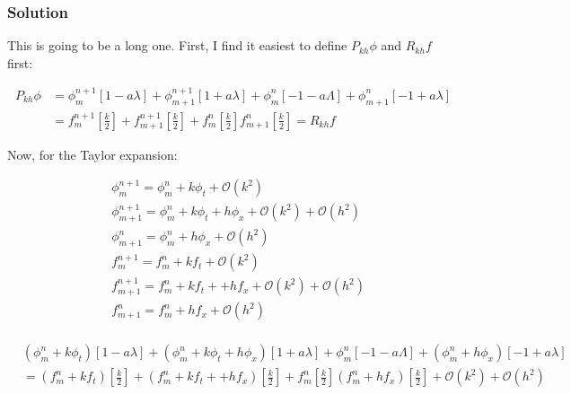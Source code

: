 \documentclass[12pt]{article}
\begin{document}
\subsubsection*{Solution}

This is going to be a long one. First, I find it easiest to define $P_{kh}\phi$ and $R_{kh}f$ first:

\begin{equation*}
    \begin{aligned}
    P_{kh}\phi & = \phi_m^{n+1}[1-a\lambda] + 
    \phi_{m+1}^{n+1}[1+a\lambda] + 
    \phi_{m}^{n}[-1-a\Lambda] + 
    \phi_{m+1}^{n}[-1+a\lambda] \\
     & = f_{m}^{n+1}\left[\frac{k}{2}\right] +f_{m+1}^{n+1}\left[\frac{k}{2}\right] +f_{m}^{n}\left[\frac{k}{2}\right] f_{m+1}^{n}\left[\frac{k}{2}\right] = R_{kh}f
    \end{aligned}
\end{equation*}

\noindent Now, for the Taylor expansion:

\begin{equation*}
\begin{aligned}
	&\phi_m^{n+1} = \phi_m^n + k\phi_t + \mathcal{O}(k^2)\\
	&\phi_{m+1}^{n+1} = \phi_m^n + k\phi_t + h\phi_x+ \mathcal{O}(k^2)+ \mathcal{O}(h^2)\\
	&\phi_{m+1}^n = \phi_m^n + h\phi_x + \mathcal{O}(h^2)\\
	&f_m^{n+1} = f_m^n + kf_t + \mathcal{O}(k^2)\\
	&f_{m+1}^{n+1} = f_m^n + kf_t + +hf_x +\mathcal{O}(k^2)+ \mathcal{O}(h^2)\\
	&f_{m+1}^{n} = f_m^n + hf_x + \mathcal{O}(h^2)\\
\end{aligned}
\end{equation*}

\begin{equation*}
    \begin{aligned}
    &(\phi_m^n + k\phi_t)[1-a\lambda] + 
    (\phi_m^n + k\phi_t + h\phi_x)[1+a\lambda] + 
    \phi_{m}^{n}[-1-a\Lambda] + 
    (\phi_m^n + h\phi_x)[-1+a\lambda] \\
     &= (f_m^n + kf_t)\left[\frac{k}{2}\right] +
     (f_m^n + kf_t + +hf_x)\left[\frac{k}{2}\right] +
     f_{m}^{n}\left[\frac{k}{2}\right] 
     (f_m^n + hf_x)\left[\frac{k}{2}\right]+\mathcal{O}(k^2)+ \mathcal{O}(h^2)
    \end{aligned}
\end{equation*}
\end{document}
